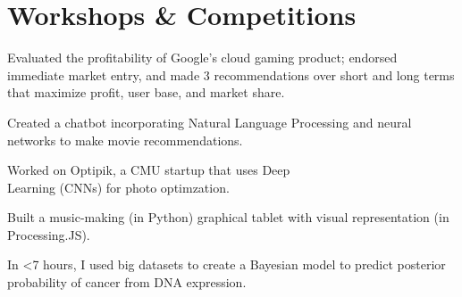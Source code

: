 \documentclass[]{deedy-resume-openfont}
\begin{document}
\section{\color{Blue} Workshops \& Competitions}
\begin{minipage}{0.5\textwidth} 


Evaluated the profitability of Google's cloud gaming product; endorsed immediate market entry, and made 3 recommendations over short and long terms that maximize profit, user base, and market share.
\sectionsep


Created a chatbot incorporating Natural Language Processing and neural networks to make movie recommendations.
\sectionsep

Worked on Optipik, a CMU startup that uses Deep\\ Learning (CNNs) for photo optimzation.
\sectionsep




\end{minipage}%
\begin{minipage}{0.5\textwidth}

Built a music-making (in Python) graphical tablet with visual representation (in Processing.JS).
\sectionsep

In <7 hours, I used big datasets to create a Bayesian model to predict posterior probability of cancer from DNA expression.
\sectionsep


\end{minipage}



\end{document}
